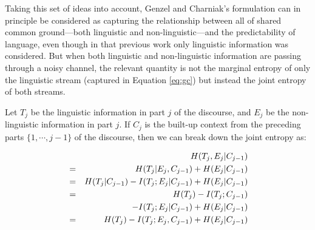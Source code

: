 \documentclass[11pt,letterpaper]{article}
\begin{document}
Taking this set of ideas into account, Genzel and Charniak's formulation can in principle be considered as capturing the relationship between all of shared common ground---both linguistic and non-linguistic---and the predictability of language, even though in that previous work only linguistic information was considered. But when both linguistic and non-linguistic information are passing through a noisy channel, the relevant quantity is not the marginal entropy of only the linguistic stream (captured in Equation \ref{eq:gc}) but instead the joint entropy of both streams. 

Let $T_j$ be the linguistic information in part $j$ of the discourse, and $E_j$ be the non-linguistic information in part $j$.  If $C_j$ is the built-up context from the preceding parts $\{1,\cdots,j-1\}$ of the discourse, then we can break down the joint entropy as:\vspace*{-1.5em}



\begin{eqnarray}
\nonumber &&\hspace*{-2.5em}H(T_j,E_j|C_{j-1}) \\
\nonumber &=& H(T_j|E_j,C_{j-1}) + H(E_j|C_{j-1}) \\
\nonumber                    &=& H(T_j|C_{j-1}) - I(T_j;E_j|C_{j-1}) + H(E_j|C_{j-1}) \\
\nonumber                    &=& H(T_j) - I(T_j;C_{j-1}) \\
\nonumber                    && \quad - I(T_j;E_j|C_{j-1}) + H(E_j|C_{j-1}) \\
\label{eq:joint-entropy}     &=& H(T_j) - I(T_j;E_j,C_{j-1}) + H(E_j|C_{j-1})
\end{eqnarray}
\end{document}
